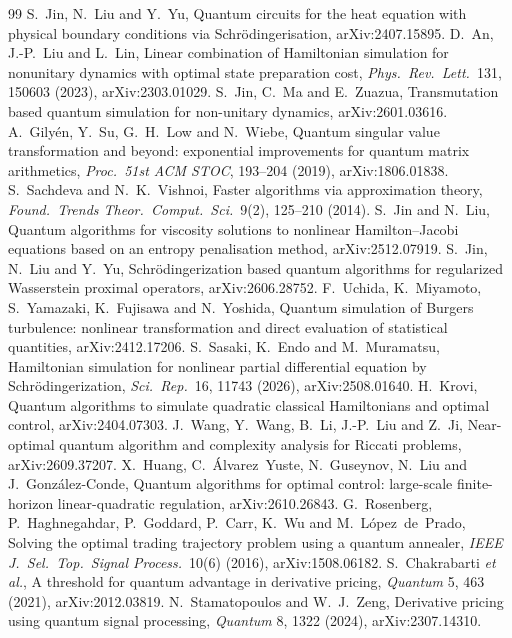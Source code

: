 \documentclass[11pt,a4paper]{article}
\theoremstyle{remark}
\begin{document}
\begin{thebibliography}{99}
 S.~Jin, N.~Liu and Y.~Yu, Quantum circuits for the heat equation with physical boundary conditions via Schr\"odingerisation, arXiv:2407.15895.
 D.~An, J.-P.~Liu and L.~Lin, Linear combination of Hamiltonian simulation for nonunitary dynamics with optimal state preparation cost, \emph{Phys.~Rev.~Lett.}~131, 150603 (2023), arXiv:2303.01029.
 S.~Jin, C.~Ma and E.~Zuazua, Transmutation based quantum simulation for non-unitary dynamics, arXiv:2601.03616.
 A.~Gily\'en, Y.~Su, G.~H.~Low and N.~Wiebe, Quantum singular value transformation and beyond: exponential improvements for quantum matrix arithmetics, \emph{Proc.~51st ACM STOC}, 193--204 (2019), arXiv:1806.01838.
 S.~Sachdeva and N.~K.~Vishnoi, Faster algorithms via approximation theory, \emph{Found.~Trends Theor.~Comput.~Sci.}~9(2), 125--210 (2014).
 S.~Jin and N.~Liu, Quantum algorithms for viscosity solutions to nonlinear Hamilton--Jacobi equations based on an entropy penalisation method, arXiv:2512.07919.
 S.~Jin, N.~Liu and Y.~Yu, Schr\"odingerization based quantum algorithms for regularized Wasserstein proximal operators, arXiv:2606.28752.
 F.~Uchida, K.~Miyamoto, S.~Yamazaki, K.~Fujisawa and N.~Yoshida, Quantum simulation of Burgers turbulence: nonlinear transformation and direct evaluation of statistical quantities, arXiv:2412.17206.
 S.~Sasaki, K.~Endo and M.~Muramatsu, Hamiltonian simulation for nonlinear partial differential equation by Schr\"odingerization, \emph{Sci.~Rep.}~16, 11743 (2026), arXiv:2508.01640.
 H.~Krovi, Quantum algorithms to simulate quadratic classical Hamiltonians and optimal control, arXiv:2404.07303.
 J.~Wang, Y.~Wang, B.~Li, J.-P.~Liu and Z.~Ji, Near-optimal quantum algorithm and complexity analysis for Riccati problems, arXiv:2609.37207.
 X.~Huang, C.~\'Alvarez~Yuste, N.~Guseynov, N.~Liu and J.~Gonz\'alez-Conde, Quantum algorithms for optimal control: large-scale finite-horizon linear-quadratic regulation, arXiv:2610.26843.
 G.~Rosenberg, P.~Haghnegahdar, P.~Goddard, P.~Carr, K.~Wu and M.~L\'opez~de~Prado, Solving the optimal trading trajectory problem using a quantum annealer, \emph{IEEE J.~Sel.~Top.~Signal Process.}~10(6) (2016), arXiv:1508.06182.
 S.~Chakrabarti \emph{et al.}, A threshold for quantum advantage in derivative pricing, \emph{Quantum} 5, 463 (2021), arXiv:2012.03819.
 N.~Stamatopoulos and W.~J.~Zeng, Derivative pricing using quantum signal processing, \emph{Quantum} 8, 1322 (2024), arXiv:2307.14310.

\end{thebibliography}
\end{document}
